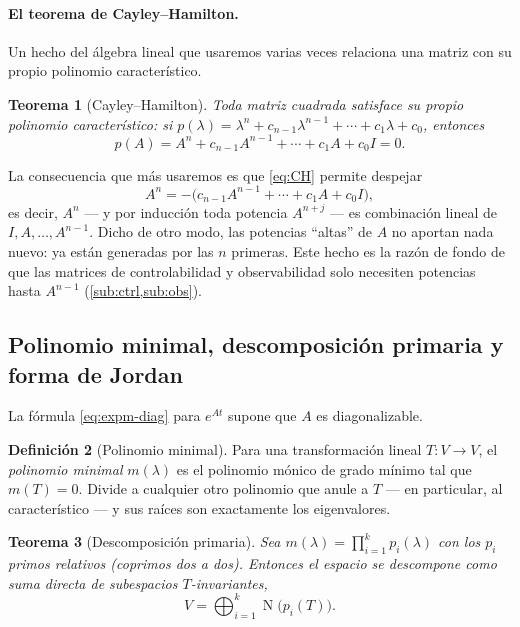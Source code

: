 \documentclass[11pt,letterpaper]{article}
\theoremstyle{definition}
\newtheorem{definicion}{Definición}[section]
\theoremstyle{plain}
\newtheorem{teorema}[definicion]{Teorema}
\theoremstyle{remark}
\DeclareMathOperator{\nuc}{N}
\begin{document}
\paragraph{El teorema de Cayley--Hamilton.} Un hecho del álgebra lineal
que usaremos varias veces relaciona una matriz con su propio polinomio
característico.

\begin{teorema}[Cayley--Hamilton]
\label{thm:CH}
Toda matriz cuadrada satisface su propio polinomio característico: si
$p(\lambda)=\lambda^n+c_{n-1}\lambda^{n-1}+\cdots+c_1\lambda+c_0$,
entonces
\begin{equation}\label{eq:CH}
  p(A)=A^n+c_{n-1}A^{n-1}+\cdots+c_1 A+c_0 I=0.
\end{equation}
\end{teorema}

La consecuencia que más usaremos es que \cref{eq:CH} permite despejar
\begin{equation}\label{eq:CH-pot}
  A^n=-\bigl(c_{n-1}A^{n-1}+\cdots+c_1 A+c_0 I\bigr),
\end{equation}
es decir, $A^n$ --- y por inducción toda potencia $A^{n+j}$ --- es
combinación lineal de $I,A,\dots,A^{n-1}$. Dicho de otro modo, las
potencias ``altas'' de $A$ no aportan nada nuevo: ya están generadas por
las $n$ primeras. Este hecho es la razón de fondo de que las matrices de
controlabilidad y observabilidad solo necesiten potencias hasta
$A^{n-1}$ (\cref{sub:ctrl,sub:obs}).

\subsection{Polinomio minimal, descomposición primaria y forma de Jordan}
\label{sub:jordan}

La fórmula \cref{eq:expm-diag} para $e^{At}$ supone que $A$ es
diagonalizable.
\begin{definicion}[Polinomio minimal]
\label{def:minpoly}
Para una transformación lineal $T:V\to V$, el \emph{polinomio minimal}
$m(\lambda)$ es el polinomio mónico de grado mínimo tal que $m(T)=0$.
Divide a cualquier otro polinomio que anule a $T$ --- en particular, al
característico --- y sus raíces son exactamente los eigenvalores.
\end{definicion}

\begin{teorema}[Descomposición primaria]
\label{thm:primaria}
Sea $m(\lambda)=\prod_{i=1}^{k}p_i(\lambda)$ con los $p_i$ primos
relativos (coprimos dos a dos). Entonces el espacio se descompone como
suma directa de subespacios $T$-invariantes,
\begin{equation}\label{eq:primaria}
  V=\bigoplus_{i=1}^{k}\nuc\!\bigl(p_i(T)\bigr).
\end{equation}
\end{teorema}
\end{document}
